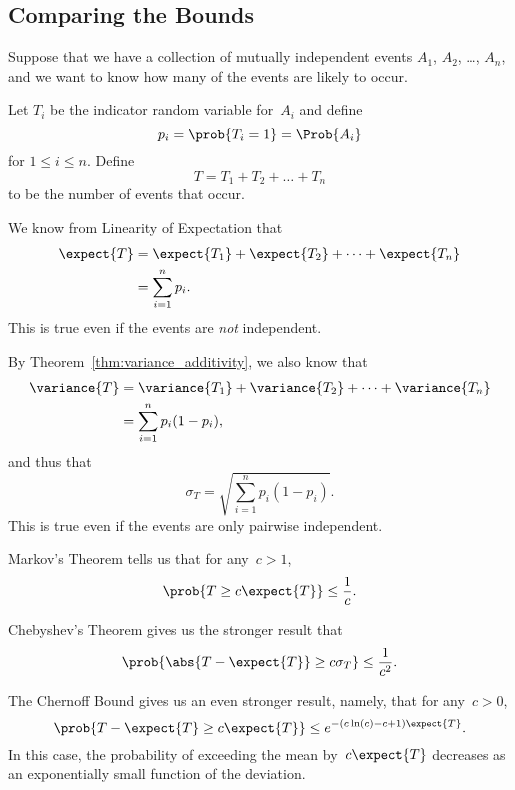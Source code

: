 \subsection{Comparing the Bounds}

Suppose that we have a collection of mutually independent events $A_1$,
$A_2$, \dots, $A_n$, and we want to know how many of the events are
likely to occur.

Let $T_i$ be the indicator random variable for~$A_i$ and define
\begin{equation*}
    p_i = \prob{T_i = 1} = \Prob{A_i}
\end{equation*}
for $1 \le i \le n$.  Define
\begin{equation*}
    T = T_1 + T_2 + \dots + T_n
\end{equation*}
to be the number of events that occur.

We know from Linearity of Expectation that
\begin{align*}
\expect{T}
    &= \expect{T_1} + \expect{T_2} + \dots + \expect{T_n} \\
    &= \sum_{i = 1}^n p_i.
\end{align*}
This is true even if the events are \emph{not} independent.

By Theorem~\ref{thm:variance_additivity}, we also know that
\begin{align*}
\variance{T}
     &= \variance{T_1} + \variance{T_2} + \dots + \variance{T_n} \\
     &= \sum_{i = 1}^n p_i (1 - p_i),
\end{align*}
and thus that
\begin{equation*}
    \sigma_T = \sqrt{ \sum_{i = 1}^n p_i (1 - p_i) }.
\end{equation*}
This is true even if the events are only pairwise independent.

Markov's Theorem tells us that for any~$c > 1$,
\begin{equation*}
    \prob{ T \ge c \expect{T} } \le \frac{1}{c}.
\end{equation*}

Chebyshev's Theorem gives us the stronger result that
\begin{equation*}
    \prob{ \abs{T - \expect{T}} \ge c \sigma_T } \le \frac{1}{c^2}.
\end{equation*}

The Chernoff Bound gives us an even stronger result, namely, that for
any~$c > 0$,
\begin{equation*}
\prob{T - \expect{T} \ge c \expect{T}}
    \le e^{-(c \ln(c) - c + 1) \expect{T}}.
\end{equation*}
In this case, the probability of exceeding the mean by~$c \expect{T}$
decreases as an exponentially small function of the deviation.

